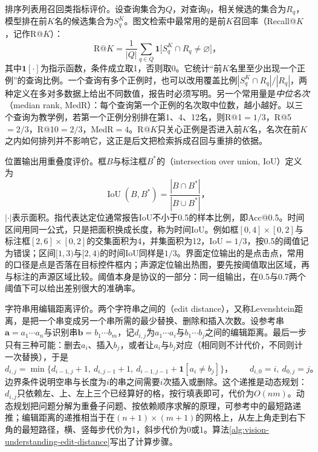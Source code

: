 排序列表用召回类指标评价。设查询集合为$Q$，对查询$q$，相关候选的集合为$R_q$，模型排在前$K$名的候选集合为$S_q^K$。图文检索中最常用的是前$K$召回率（Recall@$K$，记作R@$K$）：
\begin{equation}
  \mathrm{R@}K=\frac{1}{|Q|}\sum_{q\in Q}
    \bm 1\bigl[S_q^K\cap R_q\neq\varnothing\bigr]\text{，}
  \label{eq:vision-understanding-recall-at-k}
\end{equation}
其中$\bm 1[\cdot]$为指示函数，条件成立取1，否则取0。它统计“前$K$名里至少出现一个正例”的查询比例。一个查询有多个正例时，也可以改用覆盖比例$|S_q^K\cap R_q|/|R_q|$，两种定义在多对多数据上给出不同数值，报告时必须写明。另一个常用量是\emph{中位名次}（median rank, MedR）：每个查询第一个正例的名次取中位数，越小越好。以三个查询为教学例，若第一个正例分别排在第1、4、12名，则R@1$=1/3$，R@5$=2/3$，R@10$=2/3$，MedR$=4$。R@$K$只关心正例是否进入前$K$名，名次在前$K$之内如何排列并不影响它，这正是后文把检索拆成召回与重排的依据。

位置输出用重叠度评价。框$B$与标注框$B^*$的（intersection over union, IoU）定义为
\begin{equation}
  \operatorname{IoU}(B,B^*)=\frac{|B\cap B^*|}{|B\cup B^*|}\text{，}
  \label{eq:vision-understanding-iou}
\end{equation}
$|\cdot|$表示面积。指代表达定位通常报告IoU不小于0.5的样本比例，即Acc@0.5。时间区间用同一公式，只是把面积换成长度，称为时间IoU。例如框$[0,4]\times[0,2]$与标注框$[2,6]\times[0,2]$的交集面积为4，并集面积为12，IoU$=1/3$，按0.5的阈值记为错误；区间$[1,3)$与$[2,4)$的时间IoU同样是$1/3$。界面定位输出的是点击点，常用的口径是点是否落在目标控件框内；声源定位输出热图，要先按阈值取出区域，再与标注的声源区域比较。阈值本身是协议的一部分：同一组输出，在0.5与0.7两个阈值下可以给出差别很大的准确率。

字符串用编辑距离评价。两个字符串之间的（edit distance），又称Levenshtein距离，是把一个串变成另一个串所需的最少替换、删除和插入次数。设参考串$\bm a=a_1\cdots a_n$与识别串$\bm b=b_1\cdots b_m$，记$d_{i,j}$为$a_1\cdots a_i$与$b_1\cdots b_j$之间的编辑距离。最后一步只有三种可能：删去$a_i$、插入$b_j$，或者让$a_i$与$b_j$对应（相同则不计代价，不同则计一次替换），于是
\begin{equation}
  d_{i,j}=\min\bigl\{d_{i-1,j}+1,\ d_{i,j-1}+1,\
    d_{i-1,j-1}+\bm 1[a_i\neq b_j]\bigr\}\text{，}
  \qquad d_{i,0}=i,\ d_{0,j}=j\text{。}
  \label{eq:vision-understanding-edit-distance}
\end{equation}
边界条件说明空串与长度为$i$的串之间需要$i$次插入或删除。这个递推是动态规划：$d_{i,j}$只依赖左、上、左上三个已经算好的格，按行填表即可，代价为$O(nm)$。动态规划把问题分解为重叠子问题、按依赖顺序求解的原理，可参考中的最短路递推；编辑距离的递推相当于在$(n+1)\times(m+1)$的网格上，从左上角走到右下角的最短路径，横、竖每步代价为1，斜步代价为0或1。算法\ref{alg:vision-understanding-edit-distance}写出了计算步骤。

